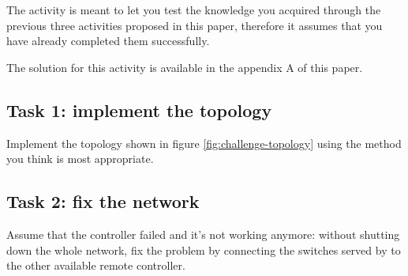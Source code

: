 The activity is meant to let you test the knowledge you acquired through the
previous three activities proposed in this paper, therefore it assumes that you
have already completed them successfully.

The solution for this activity is available in the appendix A of this paper.



\subsection*{Task 1: implement the topology}
Implement the topology shown in figure \ref{fig:challenge-topology} using the method
you think is most appropriate.

\subsection*{Task 2: fix the network}
Assume that the controller  failed and it's not working anymore: without
shutting down the whole network, fix the problem by connecting the switches served by 
to the other available remote controller.
